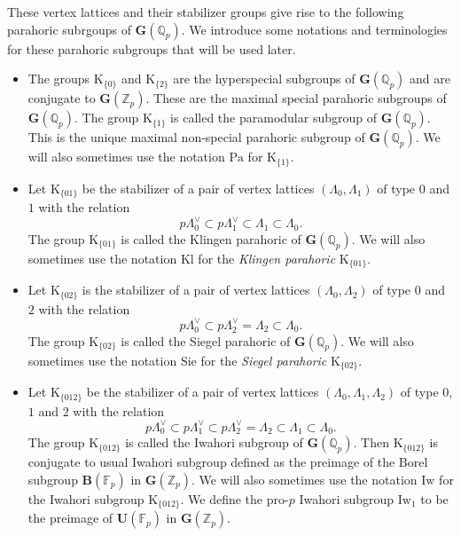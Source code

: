 \documentclass[10pt]{amsart}
\numberwithin{equation}{section}
\theoremstyle{definition}
\def\Pa{\mathrm{Pa}}
\def\Kl{\mathrm{Kl}}
\def\Sie{\mathrm{Sie}}
\def\bfB{\mathbf{B}}
\def\FF{\mathbb{F}}
\def\bfG{\mathbf{G}}
\def\QQ{\mathbb{Q}}
\def\ZZ{\mathbb{Z}}
\def\bfU{\mathbf{U}}
\def\rmK{\mathrm{K}}
\def\Iw{\mathrm{Iw}}
\begin{document}
These vertex lattices and their stabilizer groups give rise to the following parahoric subrgoups of $\bfG(\QQ_{p})$. We introduce some notations and terminologies for these parahoric subgroups that will be used later. 
\begin{itemize}
\item The groups $\rmK_{\{0\}}$ and $\rmK_{\{2\}}$ are the {hyperspecial subgroups} of $\bfG(\QQ_{p})$ and are conjugate to $\bfG(\ZZ_{p})$. These are the maximal special parahoric subgroups of $\bfG(\QQ_{p})$. The group $\rmK_{\{1\}}$ is called the {paramodular subgroup} of $\bfG(\QQ_{p})$. This is the unique maximal non-special parahoric subgroup of $\bfG(\QQ_{p})$. We will also sometimes use the notation $\Pa$ for $\rmK_{\{1\}}$.

\item  Let $\rmK_{\{01\}}$ be the stabilizer of a pair of vertex lattices $(\Lambda_{0}, \Lambda_{1})$ of type $0$ and $1$ with the relation
\begin{equation*}
p\Lambda^{\vee}_{0}\subset p\Lambda^{\vee}_{1}\subset\Lambda_{1}\subset \Lambda_{0}. 
\end{equation*}
The group $\rmK_{\{01\}}$ is called the {Klingen parahoric} of $\bfG(\QQ_{p})$. We will also sometimes use the notation $\Kl$ for the {\em Klingen parahoric} $\rmK_{\{01\}}$.

\item Let $\rmK_{\{02\}}$  is the stabilizer of a pair of vertex lattices $(\Lambda_{0}, \Lambda_{2})$ of type $0$ and $2$ with the relation 
\begin{equation*}
p\Lambda^{\vee}_{0}\subset p\Lambda^{\vee}_{2}=\Lambda_{2}\subset \Lambda_{0}. 
\end{equation*}
The group $\rmK_{\{02\}}$ is called the {Siegel parahoric} of $\bfG(\QQ_{p})$. We will also sometimes use the notation $\Sie$ for the {\em Siegel parahoric} $\rmK_{\{02\}}$.

\item Let $\rmK_{\{012\}}$ be the stabilizer of a pair of vertex lattices $(\Lambda_{0}, \Lambda_{1}, \Lambda_{2})$ of type $0$, $1$ and $2$ with the relation 
\begin{equation*}
p\Lambda^{\vee}_{0}\subset p\Lambda^{\vee}_{1}\subset p\Lambda^{\vee}_{2}=\Lambda_{2}\subset\Lambda_{1}\subset\Lambda_{0}. 
\end{equation*}
The group $\rmK_{\{012\}}$ is called the {Iwahori subgroup} of $\bfG(\QQ_{p})$. Then $\rmK_{\{012\}}$ is conjugate to usual Iwahori subgroup defined as the preimage of the Borel subgroup $\bfB(\FF_{p})$ in $\bfG(\ZZ_{p})$. We will also sometimes use the notation $\Iw$ for the Iwahori subgroup $\rmK_{\{012\}}$. We define the { pro-$p$ Iwahori subgroup} $\Iw_{1}$ to be the preimage of $\bfU(\FF_{p})$ in $\bfG(\ZZ_{p})$.
\end{itemize}
\end{document}
